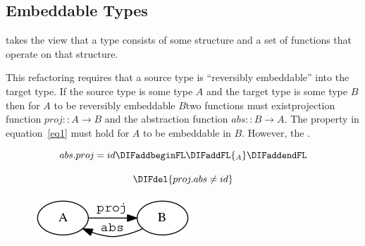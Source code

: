 \subsubsection{} 
\addtocounter{subsubsection}{-1}%
\DIFdelend \DIFaddbegin \subsection{Embeddable Types} 
\DIFaddend takes the view that a type consists of some structure and a set of functions that operate on that structure. 

This refactoring requires that a source type is ``reversibly embeddable'' into the target type. If the source type is some type $A$ and the target type is some type $B$ then for $A$ to be reversibly embeddable \DIFdelbegin {}\DIFdelend \DIFaddbegin {}\DIFaddend $B$\DIFaddbegin \DIFadd{, }\DIFaddend two functions must exist\DIFdelbegin {}\DIFdelend \DIFaddbegin {}\DIFaddend projection function $proj :: A \rightarrow B$ and the abstraction function $abs :: B \rightarrow A$\DIFaddbegin {}\DIFaddend . The property in equation~\ref{eq1} must hold for $A$ to be embeddable in $B$. However, the \DIFdelbegin {}\DIFdelend \DIFaddbegin {}\DIFaddend .   

\begin{figure}[t]
\begin{equation}\label{eq1}
abs . proj = id\DIFaddbeginFL \DIFaddFL{_A
}\DIFaddendFL \end{equation}
\DIFaddbeginFL \end{figure}
\DIFaddend 

\DIFdelbegin \begin{displaymath}\DIFdel{%
proj . abs \neq id
}\end{displaymath}
\DIFdelend \DIFaddbegin \begin{figure}[h]
	\begin{center}
		\includegraphics[scale=.5]{graphVis/Chapter3/galoisConn.png}
	\end{center}
	\caption{}
	\label{galois}
\DIFaddendFL \end{figure}

